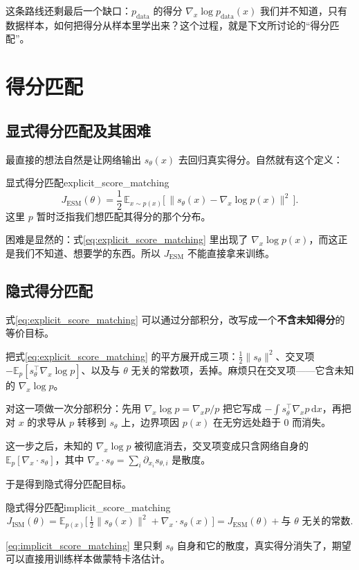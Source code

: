 这条路线还剩最后一个缺口：$p_{\text{data}}$ 的得分 $\nabla_x \log p_{\text{data}}(x)$ 我们并不知道，只有数据样本，如何把得分从样本里学出来？这个过程，就是下文所讨论的“得分匹配”。

\section{得分匹配}

\subsection{显式得分匹配及其困难}

最直接的想法自然是让网络输出 $s_\theta(x)$ 去回归真实得分。自然就有这个定义：
\begin{definition}{显式得分匹配}{explicit_score_matching}
\begin{equation}\label{eq:explicit_score_matching}
J_{\text{ESM}}(\theta) = \frac{1}{2}\, \mathbb{E}_{x \sim p(x)}\Big[\, \big\| s_\theta(x) - \nabla_x \log p(x) \big\|^2 \,\Big].
\end{equation}
这里 $p$ 暂时泛指我们想匹配其得分的那个分布。
\end{definition}

困难是显然的：式\eqref{eq:explicit_score_matching} 里出现了 $\nabla_x \log p(x)$，而这正是我们不知道、想要学的东西。所以 $J_{\text{ESM}}$ 不能直接拿来训练。

\subsection{隐式得分匹配}

式\eqref{eq:explicit_score_matching} 可以通过分部积分，改写成一个\textbf{不含未知得分}的等价目标。\cite{JMLRv6hyvarinen05a}

把式\eqref{eq:explicit_score_matching} 的平方展开成三项：$\tfrac12\|s_\theta\|^2$、交叉项 $-\mathbb{E}_{p}[s_\theta^\top\nabla_x\log p]$、以及与 $\theta$ 无关的常数项，丢掉。麻烦只在交叉项——它含未知的 $\nabla_x\log p$。

对这一项做一次分部积分：先用 $\nabla_x\log p=\nabla_x p/p$ 把它写成 $-\int s_\theta^\top\nabla_x p\,\mathrm dx$，再把对 $x$ 的求导从 $p$ 转移到 $s_\theta$ 上，边界项因 $p(x)$ 在无穷远处趋于 $0$ 而消失。

这一步之后，未知的 $\nabla_x\log p$ 被彻底消去，交叉项变成只含网络自身的 $\mathbb{E}_p[\nabla_x\cdot s_\theta]$，其中 $\nabla_x\cdot s_\theta=\sum_i\partial_{x_i}s_{\theta,i}$ 是散度。

于是得到隐式得分匹配目标。
\begin{definition}{隐式得分匹配}{implicit_score_matching}
\begin{equation}\label{eq:implicit_score_matching}
J_{\text{ISM}}(\theta) = \mathbb{E}_{p(x)}\Big[\, \tfrac{1}{2}\|s_\theta(x)\|^2 + \nabla_x \cdot s_\theta(x) \,\Big] = J_{\text{ESM}}(\theta) + \text{与 }\theta\text{ 无关的常数}.
\end{equation}
\end{definition}
\eqref{eq:implicit_score_matching} 里只剩 $s_\theta$ 自身和它的散度，真实得分消失了，期望可以直接用训练样本做蒙特卡洛估计。

